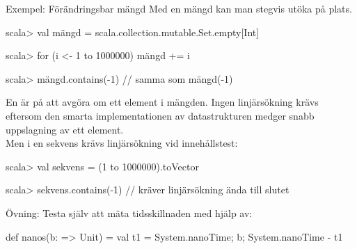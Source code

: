   
  




\begin{Slide}{Exempel: Förändringsbar mängd}\SlideFontSmall
Med en  mängd kan man stegvis utöka på plats.
\begin{REPL}
scala> val mängd = scala.collection.mutable.Set.empty[Int]

scala> for (i <- 1 to 1000000) mängd += i

scala> mängd.contains(-1)                     // samma som mängd(-1)
\end{REPL}
En  är  på att avgöra om ett element  i mängden. Ingen linjärsökning krävs eftersom den smarta implementationen av datastrukturen medger snabb uppslagning  av ett element.
\pause
\\\vspace{0.5em}Men i en sekvens krävs linjärsökning vid innehållstest:
\begin{REPL}
scala> val sekvens = (1 to 1000000).toVector

scala> sekvens.contains(-1)   // kräver linjärsökning ända till slutet
\end{REPL}
\pause\SlideFontTiny Övning: Testa själv att mäta tidsskillnaden med hjälp av:
\begin{Code}
def nanos(b: => Unit) = { val t1 = System.nanoTime; b; System.nanoTime - t1 }
\end{Code}

\end{Slide}






